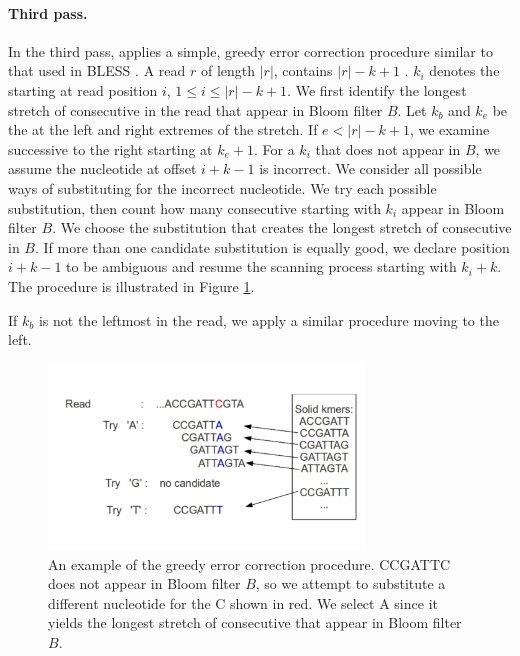 \documentclass[10pt]{article}
\begin{document}

\paragraph{Third pass.} 
In the third pass, \tool applies a simple, greedy error correction procedure similar to that used in BLESS \cite{heo2014bless}.
A read $r$ of length $|r|$, contains $|r|-k+1$ \kmers.
$k_i$ denotes the \kmer starting at read position $i$, $1\le i\le|r|-k+1$.
We first identify the longest stretch of consecutive \kmers in the read that appear in Bloom filter $B$.
Let $k_b$ and $k_e$ be the \kmers at the left and right extremes of the stretch.
If $e < |r|-k+1$, we examine successive \kmers to the right starting at $k_e+1$.
For a \kmer $k_i$ that does not appear in $B$, we assume the nucleotide at offset $i+k-1$ is incorrect.
We consider all possible ways of substituting for the incorrect nucleotide.
We try each possible substitution, then count how many consecutive \kmers starting with $k_i$ appear in Bloom filter $B$.
We choose the substitution that creates the longest stretch of consecutive \kmers in $B$.
If more than one candidate substitution is equally good, we declare position $i+k-1$ to be ambiguous and resume the scanning process starting with \kmer $k_i+k$.  The procedure is illustrated in Figure \ref{fig:error_correction}.

If $k_b$ is not the leftmost \kmer in the read, we apply a similar procedure moving to the left.

\begin{figure}[h!]
\begin{center}
\includegraphics[width=0.75\textwidth]{ErrorCorrection.jpg}
\caption{An example of the greedy error correction procedure.  \kmer CCGATTC does not appear in Bloom filter $B$, so we attempt to substitute a different nucleotide for the C shown in red.  We select A since it yields the longest stretch of consecutive \kmers that appear in Bloom filter $B$.  \label{fig:error_correction}}
\end{center}
\end{figure}
\end{document}
